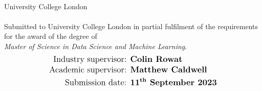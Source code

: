 \begin{singlespace}
    \begin{titlepage}
    	
    	
        \centering
		\vspace*{-3.75cm}
		 \vspace{1cm}

        { \begin{spacing}{1.35}
        \end{spacing} }
    
    	\vspace{0.5cm}        
		

        \LARGE \textbf{{\authorName}}\\
        {\Large University College London}\\
        {\Large \department}\\[2cm]

        {\large Submitted to University College London in partial fulfilment of the requirements for the award of the degree of \\ \textit{Master of Science in Data Science and Machine Learning}.}\\[0.5cm]

        \begin{align*}
        	\text{\large Industry supervisor: } & \text{\large \textbf{Colin Rowat}} \\
        	\text{\large Academic supervisor: } & \text{\large \textbf{Matthew Caldwell}} \\
        	\text{\large Submission date: } & \text{\large \textbf{\textbf{11\textsuperscript{th} September 2023}}}
        \end{align*}\\[2cm]
        

\end{titlepage}
\end{singlespace}
